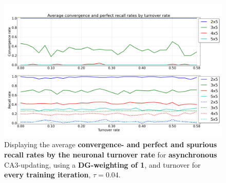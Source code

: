 \begin{figure}
    \centering
    \includegraphics[width=13cm]{fig/turnover_rates/async_tm1_dgw1}
    \caption{Displaying the average \textbf{convergence- and perfect and spurious recall rates by the neuronal turnover rate} for \textbf{asynchronous} CA3-updating, using a \textbf{DG-weighting of 1}, and turnover for \textbf{every training iteration}, $\tau=0.04$.}
    \label{fig:async_tm1_dgw1}
\end{figure}


